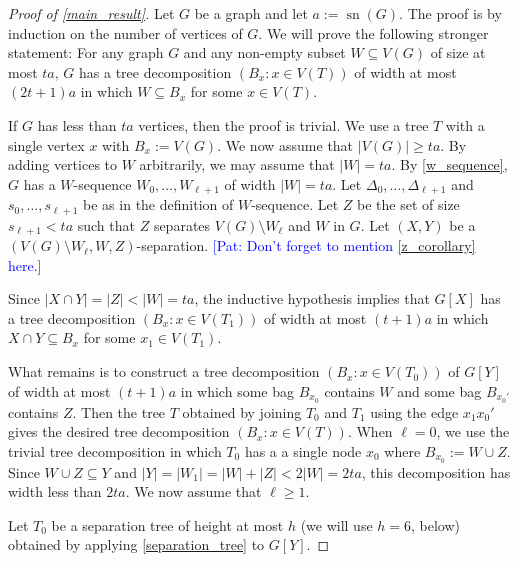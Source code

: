 \documentclass{patmorin}
\newcommand{\pat}[1]{\textcolor{Blue}{[Pat: #1]}}
\DeclareMathOperator{\sep}{sn}
\begin{document}
\begin{proof}[Proof of \cref{main_result}]
  Let $G$ be a graph and let $a:=\sep(G)$.  The proof is by induction on the number of vertices of $G$. We will prove the following stronger statement: For any graph $G$ and any non-empty subset $W\subseteq V(G)$ of size at most $ta$, $G$ has a tree decomposition $(B_x:x\in V(T))$ of width at most $(2t+1)a$ in which $W\subseteq B_x$ for some $x\in V(T)$.  

 If $G$ has less than $ta$ vertices, then the proof is trivial. We use a tree $T$ with a single vertex $x$ with $B_x:=V(G)$.  We now assume that $|V(G)|\ge ta$. By adding vertices to $W$ arbitrarily, we may assume that $|W|=ta$. By \cref{w_sequence}, $G$ has a $W$-sequence $W_0,\ldots,W_{\ell+1}$ of width $|W|=ta$.
 Let $\Delta_0,\ldots,\Delta_{\ell+1}$ and $s_0,\ldots,s_{\ell+1}$ be as in the definition of $W$-sequence. Let $Z$ be the set of size $s_{\ell+1}<ta$ such that $Z$ separates $V(G)\setminus W_{\ell}$ and $W$ in $G$.  Let $(X,Y)$ be a $(V(G)\setminus W_{\ell},W,Z)$-separation. \pat{Don't forget to mention \cref{z_corollary} here.}
 
 Since $|X\cap Y|=|Z|<|W|=ta$, the inductive hypothesis implies that $G[X]$ has a tree decomposition $(B_x:x\in V(T_1))$ of width at most $(t+1)a$ in which $X\cap Y\subseteq B_x$ for some $x_1\in V(T_1)$.

 What remains is to construct a tree decomposition $(B_x:x\in V(T_0))$ of $G[Y]$ of width at most $(t+1)a$ in which some bag $B_{x_0}$ contains $W$ and some bag $B_{x_0'}$ contains $Z$.  Then the tree $T$ obtained by joining $T_0$ and $T_1$ using the edge $x_1x_0'$ gives the desired tree decomposition $(B_x:x\in V(T))$.  When $\ell=0$, we use the trivial tree decomposition in which $T_0$ has a a single node $x_0$ where $B_{x_0}:=W\cup Z$.  Since $W\cup Z\subseteq Y$ and $|Y|=|W_1|=|W|+|Z|< 2|W|=2ta$, this decomposition has width less than $2ta$. We now assume that $\ell\ge  1$.
 
 

 Let $T_0$ be a separation tree of height at most $h$ (we will use $h=6$, below) obtained by applying \cref{separation_tree} to  $G[Y]$.  


\end{proof}
\end{document}
